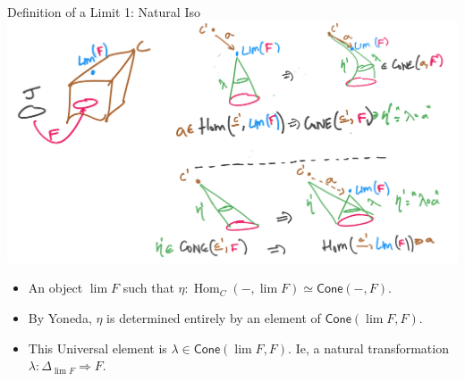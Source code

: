 \documentclass[8pt]{beamer}
\newcommand{\nt}{\Rightarrow}
\newcommand{\cat}[1]{\mathsf{#1}}
\newcommand{\cCone}{\cat{Cone}}
\newcommand{\Hom}{\ensuremath{\operatorname{Hom}}}
\begin{document}
\begin{frame}{Definition of a Limit 1: Natural Iso}
    \includegraphics[width=\textwidth]{./natural-iso-limit-cone.png}
    {\footnotesize
    \begin{itemize}
    \item An object $\lim F$ such that $\eta: \Hom_C(-, \lim F) \simeq \cCone(-, F)$. 
    \item By Yoneda, $\eta$ is determined entirely by an element of $\cCone(\lim F, F)$. 
    \item This Universal element is $\lambda \in \cCone(\lim F, F)$. Ie, a natural transformation $\lambda : \Delta_{\lim F} \nt F$. 
     \end{itemize}
    }
\end{frame}
\end{document}
